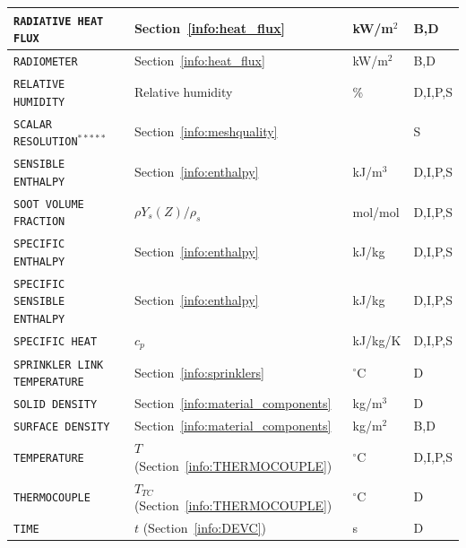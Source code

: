 \documentclass[11pt]{book}
\newcommand{\ct}{\tt\small}
\begin{document}
\begin{longtable}{@{\extracolsep{\fill}}|l|l|l|l|}
{\ct RADIATIVE HEAT FLUX}                       & Section~\ref{info:heat_flux}                  & kW/m$^2$       & B,D          \\ \hline
{\ct RADIOMETER}                                & Section~\ref{info:heat_flux}                  & kW/m$^2$       & B,D          \\ \hline
{\ct RELATIVE HUMIDITY}                         & Relative humidity                             & \%             & D,I,P,S      \\ \hline
{\ct SCALAR RESOLUTION}$^{*****}$               &  Section~\ref{info:meshquality}               &                & S            \\ \hline
{\ct SENSIBLE ENTHALPY}                         & Section~\ref{info:enthalpy}                   & kJ/m$^3$       & D,I,P,S      \\ \hline
{\ct SOOT VOLUME FRACTION}                      & $\rho Y_s(Z)/\rho_s$                          & mol/mol        & D,I,P,S      \\ \hline
{\ct SPECIFIC ENTHALPY}                         & Section~\ref{info:enthalpy}                   & kJ/kg          & D,I,P,S      \\ \hline
{\ct SPECIFIC SENSIBLE ENTHALPY}                & Section~\ref{info:enthalpy}                   & kJ/kg          & D,I,P,S      \\ \hline
{\ct SPECIFIC HEAT}                             & $c_p$                                         & kJ/kg/K        & D,I,P,S      \\ \hline
{\ct SPRINKLER LINK TEMPERATURE}                & Section~\ref{info:sprinklers}                 & $^\circ$C      & D            \\ \hline
{\ct SOLID DENSITY}                             & Section~\ref{info:material_components}        & kg/m$^3$       & D            \\ \hline
{\ct SURFACE DENSITY}                           & Section~\ref{info:material_components}        & kg/m$^2$       & B,D          \\ \hline
{\ct TEMPERATURE}                               & $T$ (Section~\ref{info:THERMOCOUPLE})         & $^\circ$C      & D,I,P,S      \\ \hline
{\ct THERMOCOUPLE}                              & $T_{TC}$ (Section~\ref{info:THERMOCOUPLE})    & $^\circ$C      & D            \\ \hline
{\ct TIME}                                      & $t$ (Section~\ref{info:DEVC})                 & s              & D            \\ \hline

\end{longtable}
\end{document}
